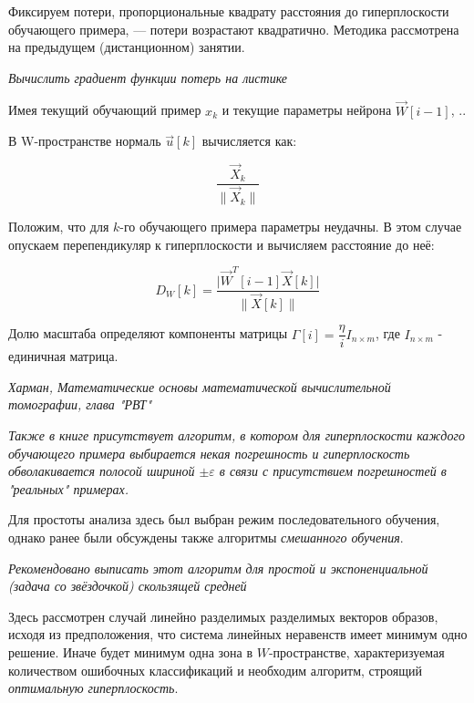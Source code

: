 \documentclass{article}
\begin{document}
Фиксируем потери, пропорциональные квадрату расстояния до гиперплоскости обучающего примера, ---
потери возрастают квадратично. Методика рассмотрена на предыдущем (дистанционном) занятии.

\begin{myquote}
    \textit{Вычислить градиент функции потерь на листике}
\end{myquote}

Имея текущий обучающий пример $x_k$ и текущие параметры нейрона $\vec{W}[i-1]$,
..

В W-пространстве нормаль $\vec{u}[k]$ вычисляется как: 

\begin{equation}
    \dfrac{\vec{X}_k}{\| \vec{X}_k \|}
\end{equation}

Положим, что для $k$-го обучающего примера параметры неудачны. В этом случае опускаем перепендикуляр
к гиперплоскости и вычисляем расстояние до неё:

\begin{equation}
    D_W [k] = \dfrac{\lvert \vec{W}^T [i-1] \vec{X}[k] \rvert}{\| \vec{X}[k] \|}
\end{equation}

Долю масштаба определяют компоненты матрицы $\Gamma[i]=\dfrac{\eta}{i} I_{n\times m}$, где $I_{n \times m}$ - единичная матрица.

\begin{myquote}
    \textit{Харман, Математические основы математической вычислительной томографии, глава "РВТ"}
\end{myquote}

\begin{myquote}
    \textit{Также в книге присутствует алгоритм, в котором для гиперплоскости каждого обучающего примера выбирается некая погрешность и гиперплоскость обволакивается полосой
    шириной $\pm \varepsilon$ в связи с присутствием погрешностей в "реальных" примерах.}
\end{myquote}

Для простоты анализа здесь был выбран режим последовательного обучения, однако ранее были обсуждены также алгоритмы
\textit{смешанного обучения}.

\begin{myquote}
    \textit{Рекомендовано выписать этот алгоритм для простой и экспоненциальной (задача со звёздочкой) скользящей средней}
\end{myquote}

Здесь рассмотрен случай линейно разделимых разделимых векторов образов, исходя из предположения, что система 
линейных неравенств имеет минимум одно решение.
Иначе будет минимум одна зона в $W$-пространстве, характеризуемая количеством ошибочных классификаций 
и необходим алгоритм, строящий \textit{оптимальную гиперплоскость}.
\end{document}
